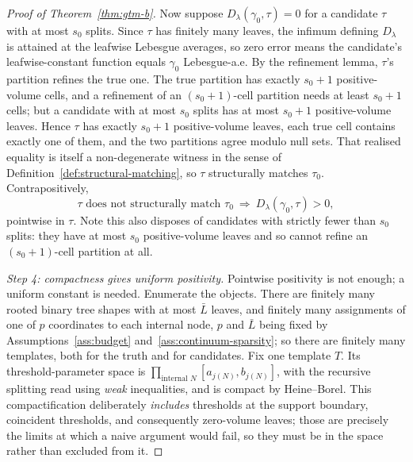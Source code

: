 \documentclass[11pt]{article}
\theoremstyle{plain}
\theoremstyle{definition}
\theoremstyle{remark}
\begin{document}
\begin{proof}[Proof of Theorem~\ref{thm:gtm-b}]
Now suppose \(D_\lambda(\gamma_0,\tau)=0\) for a candidate \(\tau\) with at
most \(s_0\) splits. Since \(\tau\) has finitely many leaves, the infimum
defining \(D_\lambda\) is attained at the leafwise Lebesgue averages, so zero
error means the candidate's leafwise-constant function equals \(\gamma_0\)
Lebesgue-a.e. By the refinement lemma, \(\tau\)'s partition refines the true
one. The true partition has exactly \(s_0+1\) positive-volume cells, and a
refinement of an \((s_0+1)\)-cell partition needs at least \(s_0+1\) cells;
but a candidate with at most \(s_0\) splits has at most \(s_0+1\)
positive-volume leaves. Hence \(\tau\) has exactly \(s_0+1\) positive-volume
leaves, each true cell contains exactly one of them, and the two partitions
agree modulo null sets. That realised equality is itself a non-degenerate
witness in the sense of Definition~\ref{def:structural-matching}, so \(\tau\)
structurally matches \(\tau_0\). Contrapositively,
\[
  \tau\text{ does not structurally match }\tau_0
  \ \Longrightarrow\
  D_\lambda(\gamma_0,\tau)>0 ,
\]
pointwise in \(\tau\). Note this also disposes of candidates with strictly
fewer than \(s_0\) splits: they have at most \(s_0\) positive-volume leaves
and so cannot refine an \((s_0+1)\)-cell partition at all.

\emph{Step 4: compactness gives uniform positivity.}
Pointwise positivity is not enough; a uniform constant is needed. Enumerate
the objects. There are finitely many rooted binary tree shapes with at most
\(\bar L\) leaves, and finitely many assignments of one of \(p\) coordinates
to each internal node, \(p\) and \(\bar L\) being fixed by
Assumptions~\ref{ass:budget} and~\ref{ass:continuum-sparsity}; so there are
finitely many templates, both for the truth and for candidates. Fix one
template \(T\). Its threshold-parameter space is
\(\prod_{\text{internal }N}[a_{j(N)},b_{j(N)}]\), with the recursive splitting
read using \emph{weak} inequalities, and is compact by Heine--Borel. This
compactification deliberately \emph{includes} thresholds at the support
boundary, coincident thresholds, and consequently zero-volume leaves; those
are precisely the limits at which a naive argument would fail, so they must be
in the space rather than excluded from it.


\end{proof}
\end{document}
